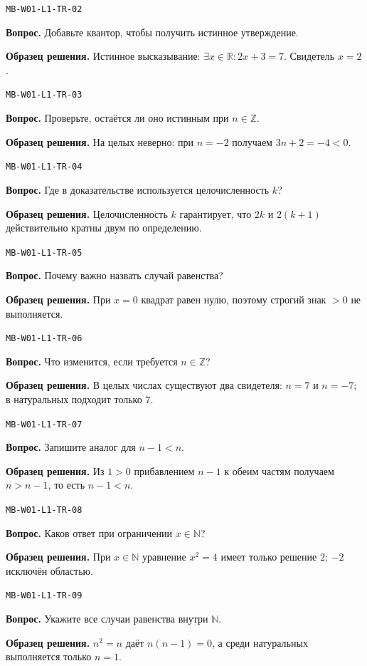 \documentclass[11pt,a4paper,openany]{book}
\newcommand{\muid}[1]{\texttt{\footnotesize #1}}
\begin{document}
\noindent\muid{MB-W01-L1-TR-02}\par \textbf{Вопрос.} Добавьте квантор, чтобы получить истинное утверждение.\par 
\textbf{Образец решения.} Истинное высказывание: $\exists x\in\mathbb R\colon 2x+3=7$. Свидетель $x=2$.\medskip

\noindent\muid{MB-W01-L1-TR-03}\par \textbf{Вопрос.} Проверьте, остаётся ли оно истинным при $n\in\mathbb Z$.\par 
\textbf{Образец решения.} На целых неверно: при $n=-2$ получаем $3n+2=-4<0$.\medskip

\noindent\muid{MB-W01-L1-TR-04}\par \textbf{Вопрос.} Где в доказательстве используется целочисленность $k$?\par 
\textbf{Образец решения.} Целочисленность $k$ гарантирует, что $2k$ и $2(k+1)$ действительно кратны двум по определению.\medskip

\noindent\muid{MB-W01-L1-TR-05}\par \textbf{Вопрос.} Почему важно назвать случай равенства?\par 
\textbf{Образец решения.} При $x=0$ квадрат равен нулю, поэтому строгий знак $>0$ не выполняется.\medskip

\noindent\muid{MB-W01-L1-TR-06}\par \textbf{Вопрос.} Что изменится, если требуется $n\in\mathbb Z$?\par 
\textbf{Образец решения.} В целых числах существуют два свидетеля: $n=7$ и $n=-7$; в натуральных подходит только $7$.\medskip

\noindent\muid{MB-W01-L1-TR-07}\par \textbf{Вопрос.} Запишите аналог для $n-1<n$.\par 
\textbf{Образец решения.} Из $1>0$ прибавлением $n-1$ к обеим частям получаем $n>n-1$, то есть $n-1<n$.\medskip

\noindent\muid{MB-W01-L1-TR-08}\par \textbf{Вопрос.} Каков ответ при ограничении $x\in\mathbb N$?\par 
\textbf{Образец решения.} При $x\in\mathbb N$ уравнение $x^2=4$ имеет только решение $2$; $-2$ исключён областью.\medskip

\noindent\muid{MB-W01-L1-TR-09}\par \textbf{Вопрос.} Укажите все случаи равенства внутри $\mathbb N$.\par 
\textbf{Образец решения.} $n^2=n$ даёт $n(n-1)=0$, а среди натуральных выполняется только $n=1$.\medskip
\end{document}
